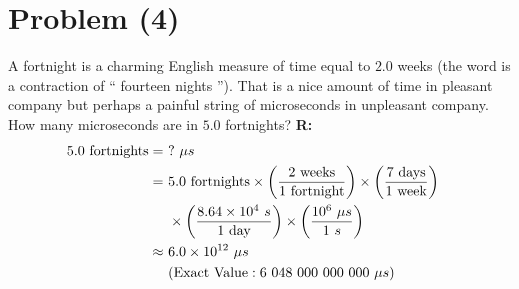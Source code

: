 \section{Problem (4)}
	A fortnight is a charming English measure of time equal to $2.0$ weeks (the word is a contraction of `` fourteen nights ''). That is a nice amount of time in pleasant company but perhaps a painful string of microseconds in unpleasant company. How many microseconds are in $5.0$ fortnights? \newline
	\textbf{R:}
	\begin{align}
		5.0 \ \text{fortnights} = \ & ? \ \mu s & \notag \\
		= \ & 5.0 \ \text{fortnights}
		\times \left( \frac{2 \ \text{weeks}}{1 \ \text{fortnight}} \right)
		\times \left( \frac{7 \ \text{days}}{1 \ \text{week}} \right)
		& \notag \\ &
		\times \left( \frac{8.64 \times 10^{4} \ s}{1 \ \text{day}} \right)
		\times \left( \frac{10^{6} \ \mu s}{1 \ s} \right)& \notag \\
		\approx \ & 6.0 \times 10^{12} \ \mu s& \\
		&( \text{Exact Value}: 6 \ 048 \ 000 \ 000 \ 000 \ \mu s )&
	\end{align}
